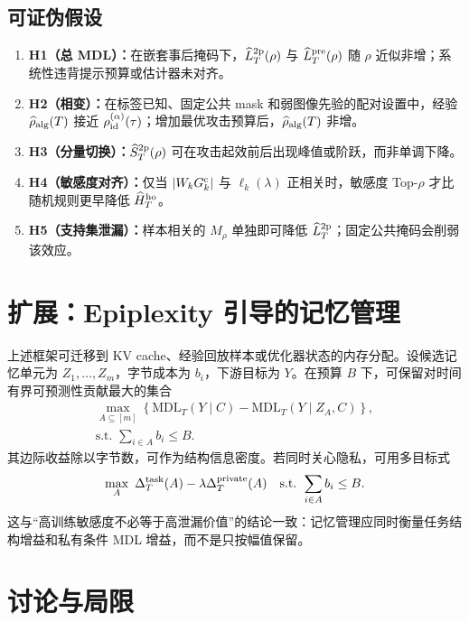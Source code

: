 \documentclass[conference,a4paper]{IEEEtran}
\newcommand{\MDL}{\mathrm{MDL}}
\begin{document}
\subsection{可证伪假设}

\begin{enumerate}
  \item \textbf{H1（总 MDL）：}在嵌套事后掩码下，$\widehat L_T^{\rm 2p}(\rho)$ 与 $\widehat L_T^{\rm pre}(\rho)$ 随 $\rho$ 近似非增；系统性违背提示预算或估计器未对齐。
  \item \textbf{H2（相变）：}在标签已知、固定公共 mask 和弱图像先验的配对设置中，经验 $\widehat\rho_{\rm alg}(T)$ 接近 $\rho_{\rm id}^{(\alpha)}(\tau)$；增加最优攻击预算后，$\widehat\rho_{\rm alg}(T)$ 非增。
  \item \textbf{H3（分量切换）：}$\widehat S_T^{\rm 2p}(\rho)$ 可在攻击起效前后出现峰值或阶跃，而非单调下降。
  \item \textbf{H4（敏感度对齐）：}仅当 $|W_kG^{\rm c}_k|$ 与 $\ell_k(\lambda)$ 正相关时，敏感度 Top-$\rho$ 才比随机规则更早降低 $\widehat H_T^{\rm ho}$。
  \item \textbf{H5（支持集泄漏）：}样本相关的 $M_\rho$ 单独即可降低 $\widehat L_T^{\rm 2p}$；固定公共掩码会削弱该效应。
\end{enumerate}

\section{扩展：Epiplexity 引导的记忆管理}

上述框架可迁移到 KV cache、经验回放样本或优化器状态的内存分配。设候选记忆单元为 $Z_1,\ldots,Z_m$，字节成本为 $b_i$，下游目标为 $Y$。在预算 $B$ 下，可保留对时间有界可预测性贡献最大的集合
\begin{multline}
\max_{A\subseteq[m]}
\left\{\MDL_T(Y\mid C)-\MDL_T(Y\mid Z_A,C)\right\},\\
\text{s.t. }\sum_{i\in A}b_i\leq B.
\label{eq:memory}
\end{multline}
其边际收益除以字节数，可作为结构信息密度。若同时关心隐私，可用多目标式
\begin{equation}
\max_A\ \Delta_T^{\rm task}(A)-\lambda\Delta_T^{\rm private}(A)
\quad\text{s.t. }\sum_{i\in A}b_i\leq B.
\end{equation}
这与“高训练敏感度不必等于高泄漏价值”的结论一致：记忆管理应同时衡量任务结构增益和私有条件 MDL 增益，而不是只按幅值保留。

\section{讨论与局限}
\end{document}
